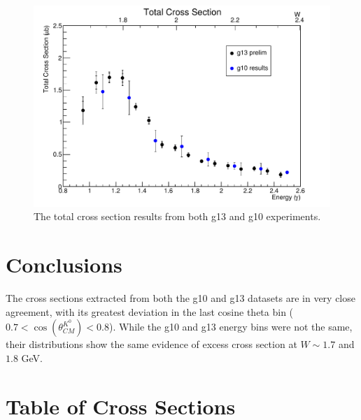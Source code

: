 \documentclass[prb,10pt,twocolumn,tightenlines,superscriptaddress]{revtex4-1}
\begin{document}
\begin{figure}[t]
    \centering
      \includegraphics[width=\linewidth]{totcross}
    \caption{The total cross section results from both g13 and g10 experiments.}
        \label{fig:totcross}%
\end{figure}

\section{Conclusions}
The cross sections extracted from both the g10 and g13 datasets are in very close agreement, with its greatest deviation in the last cosine theta bin ($0.7 < \cos(\theta^{K^{0}}_{CM}) < 0.8$). While the g10 and g13 energy bins were not the same, their distributions show the same evidence of excess cross section at $W \sim 1.7$ and $1.8$ GeV.




\FloatBarrier
\appendix
\section{Table of Cross Sections}
\end{document}
